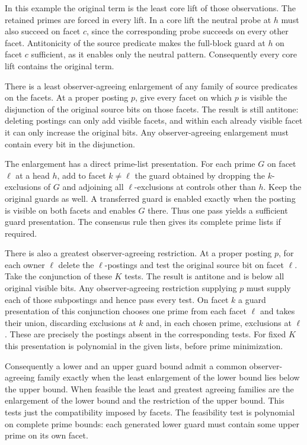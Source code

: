 In this example the original term is the least core lift
of those observations. The retained primes are forced in
every lift. In a core lift the neutral probe at $h$ must
also succeed on facet $c$, since the corresponding probe
succeeds on every other facet. Antitonicity of the source
predicate makes the full-block guard at $h$ on facet $c$
sufficient, as it enables only the neutral pattern.
Consequently every core lift contains the original term.

There is a least observer-agreeing enlargement of any
family of source predicates on the facets. At a proper
posting $p$, give every facet on which $p$ is visible the
disjunction of the original source bits on those facets.
The result is still antitone: deleting postings can only
add visible facets, and within each already visible
facet it can only increase the original bits. Any
observer-agreeing enlargement must contain every bit
in the disjunction.

The enlargement has a direct prime-list presentation.
For each prime $G$ on facet $\ell$ at a head $h$, add
to facet $k\ne\ell$ the guard obtained by dropping the
$k$-exclusions of $G$ and adjoining all $\ell$-exclusions
at controls other than $h$. Keep the original guards as
well. A transferred guard is enabled exactly when the
posting is visible on both facets and enables $G$ there.
Thus one pass yields a sufficient guard presentation.
The consensus rule then gives its complete prime lists
if required.

There is also a greatest observer-agreeing restriction.
At a proper posting $p$, for each owner $\ell$ delete the
$\ell$-postings and test the original source bit on facet
$\ell$. Take the conjunction of these $K$ tests. The result
is antitone and is below all original visible bits. Any
observer-agreeing restriction supplying $p$ must supply
each of those subpostings and hence pass every test.
On facet $k$ a guard presentation of this conjunction
chooses one prime from each facet $\ell$ and takes their
union, discarding exclusions at $k$ and, in each chosen
prime, exclusions at $\ell$. These are precisely the
postings absent in the corresponding tests. For fixed
$K$ this presentation is polynomial in the given lists,
before prime minimization.

Consequently a lower and an upper guard bound admit a
common observer-agreeing family exactly when the least
enlargement of the lower bound lies below the upper
bound. When feasible the least and greatest agreeing
families are the enlargement of the lower bound and
the restriction of the upper bound. This tests just the
compatibility imposed by facets. The feasibility test is
polynomial on complete prime bounds: each generated lower
guard must contain some upper prime on its own facet.

